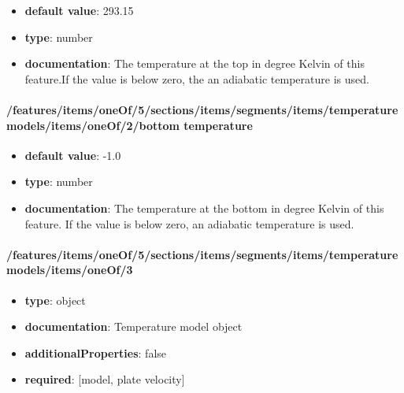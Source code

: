 \begin{itemize}\item {\bf default value}: 293.15
\item {\bf type}: number
\item {\bf documentation}: The temperature at the top in degree Kelvin of this feature.If the value is below zero, the an adiabatic temperature is used.
\end{itemize}\paragraph{/features/items/oneOf/5/sections/items/segments/items/temperature models/items/oneOf/2/bottom temperature}
\begin{itemize}\item {\bf default value}: -1.0
\item {\bf type}: number
\item {\bf documentation}: The temperature at the bottom in degree Kelvin of this feature. If the value is below zero, an adiabatic temperature is used.
\end{itemize}\paragraph{/features/items/oneOf/5/sections/items/segments/items/temperature models/items/oneOf/3}
\begin{itemize}\item {\bf type}: object
\item {\bf documentation}: Temperature model object
\item {\bf additionalProperties}: false
\item {\bf required}: [model, plate velocity]\end{itemize}
